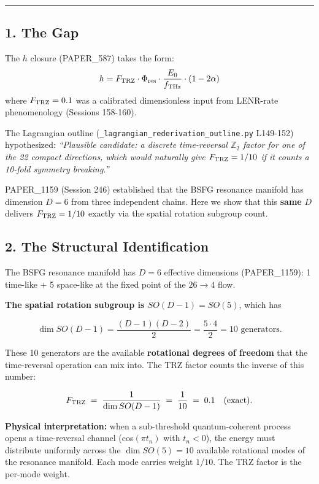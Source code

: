 \documentclass[
]{article}
\begin{document}
\begin{center}\rule{0.5\linewidth}{0.5pt}\end{center}

\subsection{1. The Gap}\label{the-gap}

The \(h\) closure (PAPER\_587) takes the form:
\[h = F_{\rm TRZ} \cdot \Phi_{\rm res} \cdot \frac{E_0}{f_{\rm THz}} \cdot (1 - 2\alpha)\]
where \(F_{\rm TRZ} = 0.1\) was a calibrated dimensionless input from
LENR-rate phenomenology (Sessions 158-160).

The Lagrangian outline (\texttt{\_lagrangian\_rederivation\_outline.py}
L149-152) hypothesized: \emph{``Plausible candidate: a discrete
time-reversal \(\mathbb{Z}_2\) factor for one of the 22 compact
directions, which would naturally give \(F_{\rm TRZ} = 1/10\) if it
counts a 10-fold symmetry breaking.''}

PAPER\_1159 (Session 246) established that the BSFG resonance manifold
has dimension \(D = 6\) from three independent chains. Here we show that
this \textbf{same} \(D\) delivers \(F_{\rm TRZ} = 1/10\) exactly via the
spatial rotation subgroup count.

\subsection{2. The Structural
Identification}\label{the-structural-identification}

The BSFG resonance manifold has \(D = 6\) effective dimensions
(PAPER\_1159): 1 time-like + 5 space-like at the fixed point of the
\(26 \to 4\) flow.

\textbf{The spatial rotation subgroup is \(SO(D-1) = SO(5)\)}, which has

\[\dim SO(D-1) = \frac{(D-1)(D-2)}{2} = \frac{5 \cdot 4}{2} = 10 \text{ generators}.\]

These 10 generators are the available \textbf{rotational degrees of
freedom} that the time-reversal operation can mix into. The TRZ factor
counts the inverse of this number:

\[F_{\rm TRZ} \;=\; \frac{1}{\dim SO(D-1)} \;=\; \frac{1}{10} \;=\; 0.1 \quad (\text{exact}).\]

\textbf{Physical interpretation:} when a sub-threshold quantum-coherent
process opens a time-reversal channel (cos\((\pi t_n)\) with
\(t_n < 0\)), the energy must distribute uniformly across the
\(\dim SO(5) = 10\) available rotational modes of the resonance
manifold. Each mode carries weight \(1/10\). The TRZ factor is the
per-mode weight.
\end{document}

